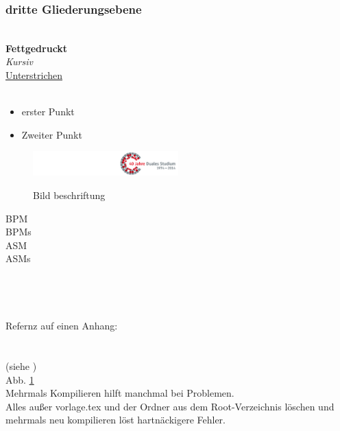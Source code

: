 \subsubsection{dritte Gliederungsebene}		%
\label{referenzKey} 					   	%
 				\\ 	%
\textbf{Fettgedruckt}					\\ 	%
\textit{Kursiv}							\\ 	%
\underline{Unterstrichen}				\\ 	%
\\											%
\begin{itemize}								%
	\item erster Punkt						%
	\item Zweiter Punkt						%
\end{itemize}								%
\begin{figure}[hbt]							%
	\centering 								%
	\includegraphics[trim = 200mm 0mm 0mm 0mm, width=0.5\textwidth]{images/jubilaeum.jpg}
	\caption{Bild beschriftung} {\emph{}} %
	\label{jubilaeum}
\end{figure}
\gls{BPM} 								\\ 	%
\glspl{BPM} 							\\ 	%
\gls{ASM} 								\\ 	%
\glspl{ASM} 							\\ 	%
 							\\ 	%
 						\\ 	%
					\\ 	%
\cite{BiBkey} 							\\ 	%

Refernz auf einen Anhang:\\
\\\\
(siehe )			\\ 	%
Abb. \ref{jubilaeum}					\\	%
Mehrmals Kompilieren hilft manchmal bei Problemen.\\
Alles außer vorlage.tex und der Ordner aus dem Root-Verzeichnis löschen und mehrmals neu kompilieren löst hartnäckigere Fehler.